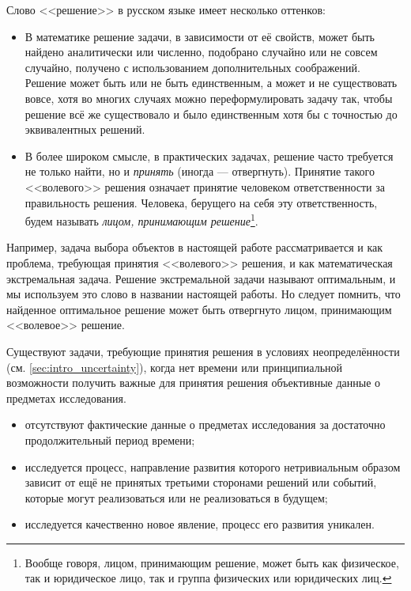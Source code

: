 Слово <<решение>> в русском языке имеет несколько оттенков: 
\begin{itemize}
  \item В математике решение задачи, в зависимости от её свойств, может быть найдено аналитически или численно, подобрано случайно или не совсем случайно, получено с использованием дополнительных соображений. Решение может быть или не быть единственным, а может и не существовать вовсе,  хотя во многих случаях можно переформулировать задачу так, чтобы решение всё же существовало и было единственным хотя бы с точностью до эквивалентных решений. 
  \item В более широком смысле, в практических задачах, решение часто требуется не только найти, но и {\sl принять} (иногда --- отвергнуть). Принятие такого <<волевого>> решения означает принятие человеком ответственности за  правильность решения. Человека, берущего на себя эту ответственность, будем называть {\sl лицом, принимающим решение}\footnote{Вообще говоря, лицом, принимающим решение, может быть как физическое, так и юридическое лицо, так и группа физических или юридических лиц.}. 
\end{itemize}
Например, задача выбора объектов в настоящей работе рассматривается и как проблема, требующая принятия <<волевого>> решения, и как математическая экстремальная задача. Решение экстремальной задачи называют оптимальным, и мы используем это слово в названии настоящей работы. Но следует помнить, что найденное оптимальное решение может быть отвергнуто лицом, принимающим <<волевое>> решение.

Существуют задачи, требующие принятия решения в условиях неопределённости (см. \ref{sec:intro_uncertainty}), когда нет времени или принципиальной возможности получить важные для принятия решения объективные данные о предметах исследования.
\begin{itemize}
 \item отсутствуют фактические данные о предметах исследования за достаточно продолжительный период времени; 
 \item исследуется процесс, направление развития которого нетривиальным образом зависит от ещё не принятых третьими сторонами решений или событий, которые могут реализоваться или не реализоваться в будущем;
 \item исследуется качественно новое явление, процесс его развития уникален.
\end{itemize}

